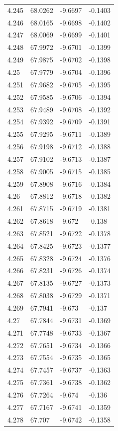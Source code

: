\begin{tabular}{llll}
4.245 & 68.0262 & -9.6697 & -0.1403 \\
4.246 & 68.0165 & -9.6698 & -0.1402 \\
4.247 & 68.0069 & -9.6699 & -0.1401 \\
4.248 & 67.9972 & -9.6701 & -0.1399 \\
4.249 & 67.9875 & -9.6702 & -0.1398 \\
4.25 & 67.9779 & -9.6704 & -0.1396 \\
4.251 & 67.9682 & -9.6705 & -0.1395 \\
4.252 & 67.9585 & -9.6706 & -0.1394 \\
4.253 & 67.9489 & -9.6708 & -0.1392 \\
4.254 & 67.9392 & -9.6709 & -0.1391 \\
4.255 & 67.9295 & -9.6711 & -0.1389 \\
4.256 & 67.9198 & -9.6712 & -0.1388 \\
4.257 & 67.9102 & -9.6713 & -0.1387 \\
4.258 & 67.9005 & -9.6715 & -0.1385 \\
4.259 & 67.8908 & -9.6716 & -0.1384 \\
4.26 & 67.8812 & -9.6718 & -0.1382 \\
4.261 & 67.8715 & -9.6719 & -0.1381 \\
4.262 & 67.8618 & -9.672 & -0.138 \\
4.263 & 67.8521 & -9.6722 & -0.1378 \\
4.264 & 67.8425 & -9.6723 & -0.1377 \\
4.265 & 67.8328 & -9.6724 & -0.1376 \\
4.266 & 67.8231 & -9.6726 & -0.1374 \\
4.267 & 67.8135 & -9.6727 & -0.1373 \\
4.268 & 67.8038 & -9.6729 & -0.1371 \\
4.269 & 67.7941 & -9.673 & -0.137 \\
4.27 & 67.7844 & -9.6731 & -0.1369 \\
4.271 & 67.7748 & -9.6733 & -0.1367 \\
4.272 & 67.7651 & -9.6734 & -0.1366 \\
4.273 & 67.7554 & -9.6735 & -0.1365 \\
4.274 & 67.7457 & -9.6737 & -0.1363 \\
4.275 & 67.7361 & -9.6738 & -0.1362 \\
4.276 & 67.7264 & -9.674 & -0.136 \\
4.277 & 67.7167 & -9.6741 & -0.1359 \\
4.278 & 67.707 & -9.6742 & -0.1358 \\

\end{tabular}
